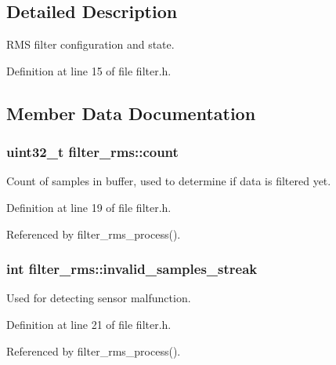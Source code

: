 \subsection{Detailed Description}
R\+M\+S filter configuration and state. 

Definition at line 15 of file filter.\+h.



\subsection{Member Data Documentation}
\hypertarget{structfilter__rms_a42976cc476c577216f312bcd496eb79b}{}
\subsubsection[{count}]{\setlength{\rightskip}{0pt plus 5cm}uint32\+\_\+t filter\+\_\+rms\+::count}\label{structfilter__rms_a42976cc476c577216f312bcd496eb79b}


Count of samples in buffer, used to determine if data is filtered yet. 



Definition at line 19 of file filter.\+h.



Referenced by filter\+\_\+rms\+\_\+process().

\hypertarget{structfilter__rms_a00a96dc7cf61e9c2643fdefc3d558ff2}{}
\subsubsection[{invalid\+\_\+samples\+\_\+streak}]{\setlength{\rightskip}{0pt plus 5cm}int filter\+\_\+rms\+::invalid\+\_\+samples\+\_\+streak}\label{structfilter__rms_a00a96dc7cf61e9c2643fdefc3d558ff2}


Used for detecting sensor malfunction. 



Definition at line 21 of file filter.\+h.



Referenced by filter\+\_\+rms\+\_\+process().

\hypertarget{structfilter__rms_a85d467406ed373c2ad1a134860fd24bd}{}
